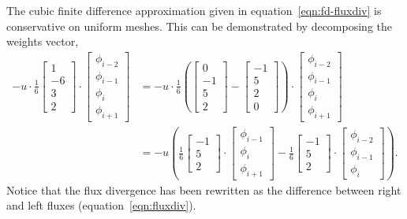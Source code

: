 \documentclass{article}
\begin{document}
The cubic finite difference approximation given in equation~\eqref{eqn:fd-fluxdiv} is conservative on uniform meshes.  This can be demonstrated by decomposing the weights vector,
\begin{align}
	-u \cdot \frac{1}{6}
	\begin{bmatrix}
		1 \\ -6 \\ 3 \\ 2
	\end{bmatrix}
	\cdot
	\begin{bmatrix}
		\phi_{i-2} \\
		\phi_{i-1} \\
		\phi_i \\
		\phi_{i+1}
	\end{bmatrix}
	&= 
	-u \cdot
	\frac{1}{6}
	\left(
	\begin{bmatrix}
		0 \\ -1 \\ 5 \\ 2
	\end{bmatrix}
	-
	\begin{bmatrix}
		-1 \\ 5 \\ 2 \\ 0
	\end{bmatrix}
	\right)
	\cdot
	\begin{bmatrix}
		\phi_{i-2} \\
		\phi_{i-1} \\
		\phi_i \\
		\phi_{i+1}
	\end{bmatrix} \\
	&=
	-u \left(
	\frac{1}{6}
	\begin{bmatrix}
		-1 \\ 5 \\ 2
	\end{bmatrix}
	\cdot
	\begin{bmatrix}
		\phi_{i-1} \\
		\phi_i \\
		\phi_{i+1}
	\end{bmatrix}
	-
	\frac{1}{6}
	\begin{bmatrix}
		-1 \\ 5 \\ 2
	\end{bmatrix}
	\cdot
	\begin{bmatrix}
		\phi_{i-2} \\
		\phi_{i-1} \\
		\phi_i
	\end{bmatrix} \right) \text{.} \label{eqn:fd-fluxcoeffs}
\end{align}
Notice that the flux divergence has been rewritten as the difference between right and left fluxes (equation~\ref{eqn:fluxdiv}).
\end{document}
